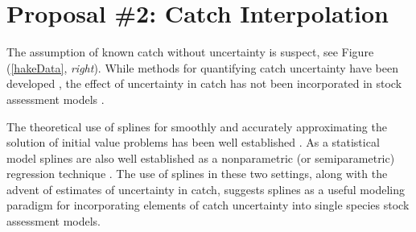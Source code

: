 \documentclass[12pt]{article}
\begin{document}
%
%
%
%
%
\section*{Proposal \#2: Catch Interpolation}

%
The assumption of known catch without uncertainty is suspect, see Figure (\ref{hakeData}, \emph{right}).  
While methods for quantifying catch uncertainty have been developed , 
the effect of uncertainty in catch has not been incorporated in stock assessment models .    

%
The theoretical use of splines for smoothly and accurately approximating the 
solution of initial value problems has been well established . %
As a statistical model splines are also well established as a nonparametric 
(or semiparametric) regression technique . %
The use of splines in these two settings, along with the advent of estimates of 
uncertainty in catch, suggests splines as a useful modeling paradigm for 
incorporating elements of catch uncertainty into single species stock 
assessment models. 
\end{document}

